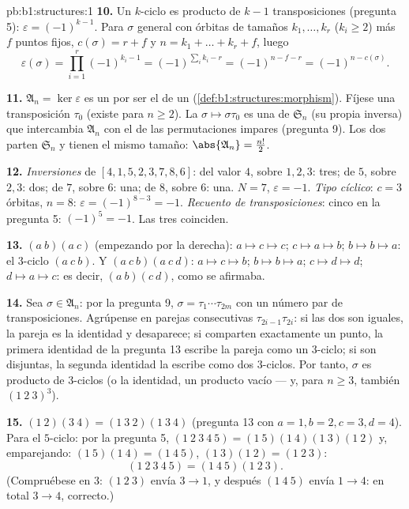 \begin{solution}{pb:b1:structures:1}
\textbf{10.} Un $k$-ciclo es producto de $k - 1$ transposiciones
(pregunta 5): $\varepsilon = (-1)^{k-1}$. Para $\sigma$ general con
órbitas de tamaños $k_1, \dots, k_r$ ($k_i \geq 2$) más $f$ puntos
fijos, $c(\sigma) = r + f$ y $n = k_1 + \dots + k_r + f$, luego
\[
\varepsilon(\sigma) = \prod_{i=1}^r (-1)^{k_i - 1}
= (-1)^{\sum_i k_i - r} = (-1)^{n - f - r} = (-1)^{n -
c(\sigma)} .
\]

\textbf{11.} $\mathfrak A_n = \ker\varepsilon$ es un  por ser
el  de un  (\cref{def:b1:structures:morphism}). Fíjese
una transposición $\tau_0$ (existe para $n \geq 2$). La 
$\sigma \mapsto \sigma\tau_0$ es una  de $\mathfrak S_n$ (su
propia inversa) que intercambia $\mathfrak A_n$ con el  de las
permutaciones impares (pregunta 9). Los dos  parten
$\mathfrak S_n$ y tienen el mismo tamaño: $\abs{\mathfrak A_n} = \frac{n!}2$.

\textbf{12.} \emph{Inversiones} de $[4, 1, 5, 2, 3, 7, 8, 6]$: del
valor $4$, sobre $1, 2, 3$: tres; de $5$, sobre $2, 3$: dos; de $7$,
sobre $6$: una; de $8$, sobre $6$: una. $N = 7$, $\varepsilon = -1$.
\emph{Tipo cíclico}: $c = 3$ órbitas, $n = 8$:
$\varepsilon = (-1)^{8-3} = -1$. \emph{Recuento de transposiciones}:
cinco en la pregunta 5: $(-1)^5 = -1$. Las tres coinciden.

\textbf{13.} $(a\ b)(a\ c)$ (empezando por la derecha):
$a \mapsto c \mapsto c$; $c \mapsto a \mapsto b$; $b \mapsto b \mapsto
a$: el $3$-ciclo $(a\ c\ b)$. Y $(a\ c\ b)(a\ c\ d)$:
$a \mapsto c \mapsto b$; $b \mapsto b \mapsto a$; $c \mapsto d \mapsto
d$; $d \mapsto a \mapsto c$: es decir, $(a\ b)(c\ d)$, como se afirmaba.

\textbf{14.} Sea $\sigma \in \mathfrak A_n$: por la pregunta 9,
$\sigma = \tau_1\cdots\tau_{2m}$ con un número par de transposiciones.
Agrúpense en parejas consecutivas $\tau_{2i-1}\tau_{2i}$: si las dos
son iguales, la pareja es la identidad y desaparece; si comparten
exactamente un punto, la primera identidad de la pregunta 13 escribe
la pareja como un $3$-ciclo; si son disjuntas, la segunda identidad la
escribe como dos $3$-ciclos. Por tanto, $\sigma$ es producto de
$3$-ciclos (o la identidad, un producto vacío --- y, para $n \geq 3$,
también $(1\ 2\ 3)^3$).

\textbf{15.} $(1\ 2)(3\ 4) = (1\ 3\ 2)(1\ 3\ 4)$ (pregunta 13 con
$a{=}1, b{=}2, c{=}3, d{=}4$). Para el $5$-ciclo: por la pregunta 5,
$(1\ 2\ 3\ 4\ 5) = (1\ 5)(1\ 4)(1\ 3)(1\ 2)$ y, emparejando:
$(1\ 5)(1\ 4) = (1\ 4\ 5)$, $(1\ 3)(1\ 2) = (1\ 2\ 3)$:
\[
(1\ 2\ 3\ 4\ 5) = (1\ 4\ 5)(1\ 2\ 3) .
\]
(Compruébese en $3$: $(1\ 2\ 3)$ envía $3 \to 1$, y después
$(1\ 4\ 5)$ envía $1 \to 4$: en total $3 \to 4$, correcto.)


\end{solution}

